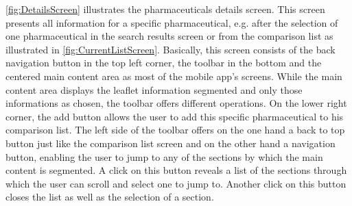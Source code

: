 \ref{fig:DetailsScreen} illustrates the pharmaceuticals details screen. This screen presents all information for a specific pharmaceutical, e.g. after the selection of one pharmaceutical in the search results screen or from the comparison list as illustrated in \ref{fig:CurrentListScreen}. Basically, this screen consists of the back navigation button in the top left corner, the toolbar in the bottom and the centered main content area as most of the mobile app's screens. While the main content area displays the leaflet information segmented and only those informations as chosen, the toolbar offers different operations. On the lower right corner, the add button allows the user to add this specific pharmaceutical to his comparison list. The left side of the toolbar offers on the one hand a back to top button just like the comparison list screen and on the other hand a navigation button, enabling the user to jump to any of the sections by which the main content is segmented. A click on this button reveals a list of the sections through which the user can scroll and select one to jump to. Another click on this button closes the list as well as the selection of a section.

